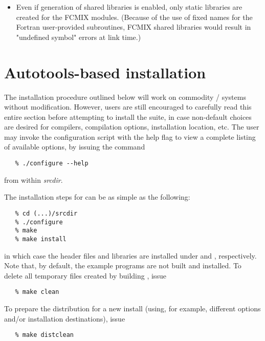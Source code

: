 \begin{itemize}
\item Even if generation of shared libraries is enabled, only static libraries are created
  for the FCMIX modules.  (Because of the use of fixed names for the Fortran
  user-provided subroutines, FCMIX shared libraries would result in
  "undefined symbol" errors at link time.)

\end{itemize}

\section{Autotools-based installation}\label{s:autotool_inst}

The installation procedure outlined below will work on commodity {\linux}/{\unix} 
systems without modification. However, users are still encouraged to carefully read 
this entire section before attempting to install the {\sundials} suite, in case
non-default choices are desired for compilers, compilation options,
installation location, etc.  The user may invoke the configuration
script with the help flag to view a complete listing of available
options, by issuing the command
\begin{verbatim}
   % ./configure --help 
\end{verbatim}
from within {\em srcdir}.

\vspace{0.2in}
{\noindent}The installation steps for {\sundials} can be as simple as
the following: 
\begin{verbatim}
   % cd (...)/srcdir
   % ./configure
   % make
   % make install
\end{verbatim}
in which case the {\sundials} header files and libraries are installed
under  and ,
respectively. Note that, by default, the example programs are not
built and installed.
To delete all temporary files created by building {\sundials}, issue
\begin{verbatim}
   % make clean
\end{verbatim}
To prepare the {\sundials} distribution for a new install (using, for example,
different options and/or installation destinations), issue
\begin{verbatim}
   % make distclean
\end{verbatim}


